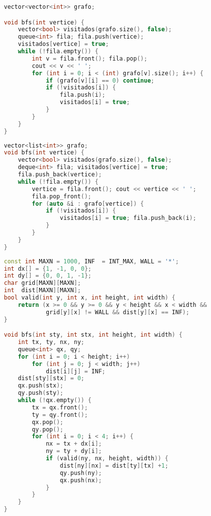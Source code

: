 \begin{lstlisting}[language=C++, title=BFS para Matriz de Adjacências]
vector<vector<int>> grafo;

void bfs(int vertice) {
    vector<bool> visitados(grafo.size(), false);
    queue<int> fila; fila.push(vertice);
    visitados[vertice] = true;
    while (!fila.empty()) {
        int v = fila.front(); fila.pop();
        cout << v << ' ';
        for (int i = 0; i < (int) grafo[v].size(); i++) {
            if (grafo[v][i] == 0) continue;
            if (!visitados[i]) {
                fila.push(i);
                visitados[i] = true;
            }
        }
    }
}
\end{lstlisting}

\begin{lstlisting}[language=C++, title=BFS para Lista de Adjacências]
vector<list<int>> grafo;
void bfs(int vertice) {
    vector<bool> visitados(grafo.size(), false);
    deque<int> fila; visitados[vertice] = true;
    fila.push_back(vertice);
    while (!fila.empty()) {
        vertice = fila.front(); cout << vertice << ' ';
        fila.pop_front();
        for (auto &i : grafo[vertice]) {
            if (!visitados[i]) {
                visitados[i] = true; fila.push_back(i);
            }
        }
    }
}
\end{lstlisting}

\newpage

\begin{lstlisting}[language=C++, title=Exemplo de BFS em Grid para calcular distância]
const int MAXN = 1000, INF  = INT_MAX, WALL = '*';
int dx[] = {1, -1, 0, 0};
int dy[] = {0, 0, 1, -1};
char grid[MAXN][MAXN];
int  dist[MAXN][MAXN];
bool valid(int y, int x, int height, int width) {
	return (x >= 0 && y >= 0 && y < height && x < width && 
	        grid[y][x] != WALL && dist[y][x] == INF);
}

void bfs(int sty, int stx, int height, int width) {
	int tx, ty, nx, ny;
	queue<int> qx, qy;
	for (int i = 0; i < height; i++)
		for (int j = 0; j < width; j++)
			dist[i][j] = INF;
	dist[sty][stx] = 0;
	qx.push(stx);
	qy.push(sty);
	while (!qx.empty()) {
		tx = qx.front();
		ty = qy.front();
		qx.pop();
		qy.pop();
		for (int i = 0; i < 4; i++) {
			nx = tx + dx[i];
			ny = ty + dy[i];
			if (valid(ny, nx, height, width)) {
				dist[ny][nx] = dist[ty][tx] +1;
				qy.push(ny);
				qx.push(nx);
			}
		}
	}
}
\end{lstlisting}